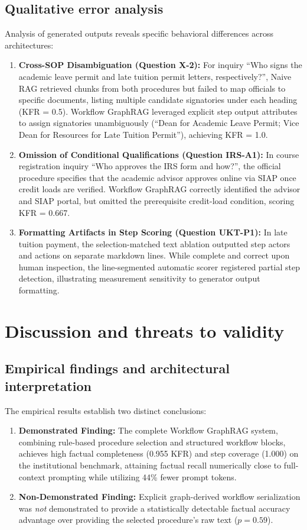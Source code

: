 \documentclass[preprint,10pt]{elsarticle}
\begin{document}
\subsection{Qualitative error analysis}
Analysis of generated outputs reveals specific behavioral differences across architectures:
\begin{enumerate}[leftmargin=*]
\item \textbf{Cross-SOP Disambiguation (Question X-2):} For inquiry ``Who signs the academic leave permit and late tuition permit letters, respectively?'', Naive RAG retrieved chunks from both procedures but failed to map officials to specific documents, listing multiple candidate signatories under each heading (KFR = 0.5). Workflow GraphRAG leveraged explicit step output attributes to assign signatories unambiguously (``Dean for Academic Leave Permit; Vice Dean for Resources for Late Tuition Permit''), achieving KFR = 1.0.
\item \textbf{Omission of Conditional Qualifications (Question IRS-A1):} In course registration inquiry ``Who approves the IRS form and how?'', the official procedure specifies that the academic advisor approves online via SIAP once credit loads are verified. Workflow GraphRAG correctly identified the advisor and SIAP portal, but omitted the prerequisite credit-load condition, scoring KFR = 0.667.
\item \textbf{Formatting Artifacts in Step Scoring (Question UKT-P1):} In late tuition payment, the selection-matched text ablation outputted step actors and actions on separate markdown lines. While complete and correct upon human inspection, the line-segmented automatic scorer registered partial step detection, illustrating measurement sensitivity to generator output formatting.
\end{enumerate}

\section{Discussion and threats to validity}
\label{sec:discussion}

\subsection{Empirical findings and architectural interpretation}
The empirical results establish two distinct conclusions:
\begin{enumerate}[leftmargin=*]
\item \textbf{Demonstrated Finding:} The complete Workflow GraphRAG system, combining rule-based procedure selection and structured workflow blocks, achieves high factual completeness (0.955 KFR) and step coverage (1.000) on the institutional benchmark, attaining factual recall numerically close to full-context prompting while utilizing 44\% fewer prompt tokens.
\item \textbf{Non-Demonstrated Finding:} Explicit graph-derived workflow serialization was \emph{not} demonstrated to provide a statistically detectable factual accuracy advantage over providing the selected procedure's raw text ($p = 0.59$).
\end{enumerate}
\end{document}

